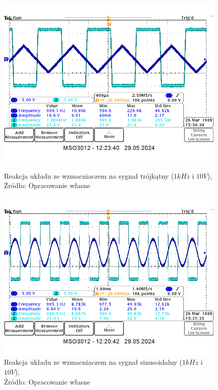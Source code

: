 \documentclass{article}
\begin{document}
        \begin{figure}[!ht]
          \begin{minipage}{.5\textwidth}
            \centering
            \includegraphics[scale=0.3]{grafiki/wzmacniacz_1kHz_10V_ramp_10kOhm.png}
            \caption{Reakcja układu ze wzmacniaczem na sygnał trójkątny ($1kHz$ i $10V$),
            \\Źródło: Opracowanie własne}
          \end{minipage}
          \begin{minipage}{.5\textwidth}
            \centering
            \includegraphics[scale=0.3]{grafiki/wzmacniacz_1kHz_10V_sin_10kOhm.png}
            \caption{Reakcja układu ze wzmacniaczem na sygnał sinusoidalny ($1kHz$ i $10V$),
            \\Źródło: Opracowanie własne}
          \end{minipage}
        \end{figure}
\end{document}
